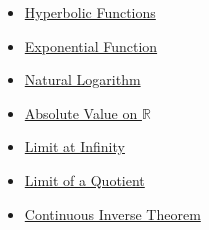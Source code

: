 \begin{dependencies}
\begin{itemize}
  \item \hyperref[def:hyperbolic]{Hyperbolic Functions}
  \item \hyperref[def:exponential]{Exponential Function}
  \item \hyperref[def:natural-logarithm]{Natural Logarithm}
  \item \hyperref[def:real-chapter-absolute-value-on-r]{Absolute Value on $\mathbb{R}$}
  \item \hyperref[def:limit-at-infinity]{Limit at Infinity}
  \item \hyperref[thm:limit-quotient]{Limit of a Quotient}
  \item \hyperref[thm:continuous-inverse-theorem]{Continuous Inverse Theorem}
\end{itemize}
\end{dependencies}
